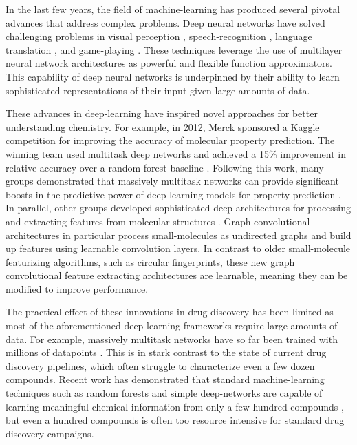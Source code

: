 In the last few years, the field of machine-learning has produced several pivotal advances that address complex problems. Deep neural networks have solved challenging problems in visual perception \cite{ILSVRC15}, speech-recognition \cite{deng2013new}, language translation \cite{wu2016google}, and game-playing \cite{silver2016mastering}. These techniques leverage the use of multilayer neural network architectures as powerful and flexible function approximators. This capability of deep neural networks is underpinned by their ability to learn sophisticated representations of their input given large amounts of data.

These advances in deep-learning have inspired novel approaches for better understanding chemistry. For example, in 2012, Merck sponsored a Kaggle competition for improving the accuracy of molecular property prediction. The winning team used multitask deep networks and achieved a 15\% improvement in relative accuracy over a random forest baseline \cite{dahl2012deep}. Following this work, many groups demonstrated that massively multitask networks can provide significant boosts in the predictive power of deep-learning models for property prediction \cite{ramsundar2015massively, unterthiner2014deep}. In parallel, other groups developed sophisticated deep-architectures for processing and extracting features from molecular structures \cite{lusci2013deep}. Graph-convolutional architectures \cite{duvenaud2015convolutional, kearnes2016molecular} in particular process small-molecules as undirected graphs and build up features using learnable convolution layers. In contrast to older small-molecule featurizing algorithms, such as circular fingerprints\cite{rogers2010extended}, these new graph convolutional feature extracting architectures are learnable, meaning they can be modified to improve performance. 

The practical effect of these innovations in drug discovery has been limited as most of the aforementioned deep-learning frameworks require large-amounts of data. For example, massively multitask networks have so far been trained with millions of datapoints \cite{ramsundar2015massively}. This is in stark contrast to the state of current drug discovery pipelines, which often struggle to characterize even a few dozen compounds. Recent work has demonstrated that standard machine-learning techniques such as random forests and simple deep-networks are capable of learning meaningful chemical information from only a few hundred compounds \cite{subramanian2016computational}, but even a hundred compounds is often too resource intensive for standard drug discovery campaigns. 

